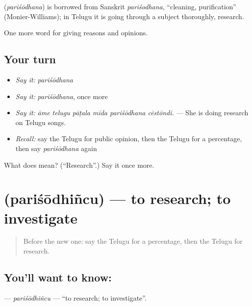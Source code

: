 \begin{cousinweb}
\textbf{} (\emph{pariśōdhana}) is borrowed from Sanskrit \emph{pariśodhana}, \textquotedblleft{}cleaning, purification\textquotedblright{} (Monier-Williams); in Telugu it is going through a subject thoroughly, research.
\end{cousinweb}

\begin{grammarlens}[title={What you've built}]
One more word for giving reasons and opinions.
\end{grammarlens}

\subsection*{Your turn}
\begin{itemize}
\raggedright
  \item \emph{Say it:} \emph{pariśōdhana}
  \item \emph{Say it:} \emph{pariśōdhana}, once more
  \item \emph{Say it:} \emph{āme telugu pāṭala mīda pariśōdhana cēstōndi.} — She is doing research on Telugu songs.
  \item \emph{Recall:} say the Telugu for public opinion, then the Telugu for a percentage, then say \emph{pariśōdhana} again
\end{itemize}

\begin{tcolorbox}[breakable,colback=teal!4,colframe=teal!35!black,title={Before you move on}]
What does  mean? (\textquotedblleft{}Research\textquotedblright{}.) Say it once more.
\end{tcolorbox}
\section[\texorpdfstring{\te{పరిశోధించు} (pariśōdhiñcu)}{పరిశోధించు (pariśōdhiñcu)}]{ (pariśōdhiñcu) — to research; to investigate}

\label{lesson:TE-C412-parisodhincu}



\begin{quote}
Before the new one: say the Telugu for a percentage, then the Telugu for research.
\end{quote}

\subsection*{You'll want to know: }
\textbf{} — \emph{pariśōdhiñcu} — \textquotedblleft{}to research; to investigate\textquotedblright{}.

